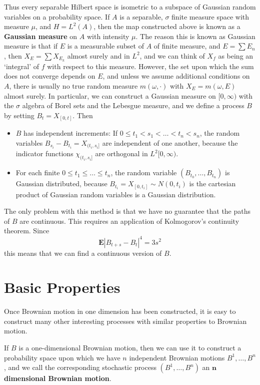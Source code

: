 Thus every separable Hilbert space is isometric to a subspace of Gaussian random variables on a probability space. If $A$ is a separable, $\sigma$ finite measure space with measure $\mu$, and $H = L^2(A)$, then the map constructed above is known as a {\bf Gaussian measure} on $A$ with intensity $\mu$. The reason this is known as Gaussian measure is that if $E$ is a measurable subset of $A$ of finite measure, and $E = \sum E_n$, then $X_E = \sum X_{E_k}$ almost surely and in $L^2$, and we can think of $X_f$ as being an `integral' of $f$ with respect to this measure. However, the set upon which the sum does not converge depends on $E$, and unless we assume additional conditions on $A$, there is usually no true random measure $m(\omega, \cdot)$ with $X_E = m(\omega,E)$ almost surely. In particular, we can construct a Gaussian measure on $[0,\infty)$ with the $\sigma$ algebra of Borel sets and the Lebesgue measure, and we define a process $B$ by setting $B_t = X_{[0,t]}$. Then
%
\begin{itemize}
    \item $B$ has independent increments: If $0 \leq t_1 < s_1 < \dots < t_n < s_n$, the random variables $B_{s_i} - B_{t_i} = X_{(t_i,s_i]}$ are independent of one another, because the indicator functions $\chi_{(t_i,s_i]}$ are orthogonal in $L^2[0,\infty)$.

    \item For each finite $0 \leq t_1 \leq \dots \leq t_n$, the random variable $(B_{t_0}, \dots, B_{t_n})$ is Gaussian distributed, because $B_{t_i} = X_{[0,t_i]} \sim N(0,t_i)$ is the cartesian product of Gaussian random variables is a Gaussian distribution.
\end{itemize}
%
The only problem with this method is that we have no guarantee that the paths of $B$ are continuous. This requires an application of Kolmogorov's continuity theorem. Since
%
\[ \mathbf{E} |B_{t+s} - B_t|^4 = 3s^2 \]
%
this means that we can find a continuous version of $B$.

\section{Basic Properties}

Once Brownian motion in one dimension has been constructed, it is easy to construct many other interesting processes with similar properties to Brownian motion.

\begin{example}
    If $B$ is a one-dimensional Brownian motion, then we can use it to construct a probability space upon which we have $n$ independent Brownian motions $B^1, \dots, B^n$, and we call the corresponding stochastic process $(B^1, \dots, B^n)$ an {\bf $\mathbf{n}$ dimensional Brownian motion}.
\end{example}


